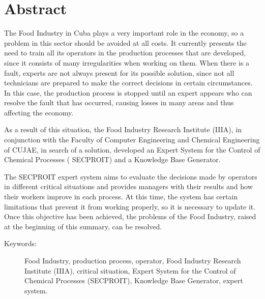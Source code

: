 \section*{Abstract}
The Food Industry in Cuba plays a very important role in the economy, so a problem in this sector should be avoided at all costs. It currently presents the need to train all its operators in the production processes that are developed, since it consists of many irregularities when working on them. When there is a fault, experts are not always present for its possible solution, since not all technicians are prepared to make the correct decisions in certain circumstances. In this case, the production process is stopped until an expert appears who can resolve the fault that has occurred, causing losses in many areas and thus affecting the economy.

As a result of this situation, the Food Industry Research Institute (IIIA), in conjunction with the Faculty of Computer Engineering and Chemical Engineering of CUJAE, in search of a solution, developed an Expert System for the Control of Chemical Processes ( SECPROIT) and a Knowledge Base Generator.

The SECPROIT expert system aims to evaluate the decisions made by operators in different critical situations and provides managers with their results and how their workers improve in each process. At this time, the system has certain limitations that prevent it from working properly, so it is necessary to update it. Once this objective has been achieved, the problems of the Food Industry, raised at the beginning of this summary, can be resolved.

\vfill

\begin{description}
	\item[Keywords:]{Food Industry, production process, operator, Food Industry Research Institute (IIIA), critical situation, Expert System for the Control of Chemical Processes (SECPROIT), Knowledge Base Generator, expert system.}
\end{description}